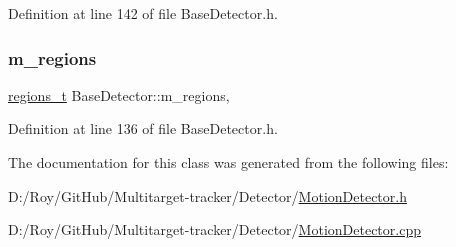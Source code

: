 Definition at line 142 of file Base\+Detector.\+h.

\mbox{\label{class_base_detector_a409c20093acba261db8354ca72058fce}} 
\subsubsection{\texorpdfstring{m\+\_\+regions}{m\_regions}}
{\footnotesize\ttfamily \mbox{\hyperlink{defines_8h_a01db0de56a20f4342820a093c5154536}{regions\+\_\+t}} Base\+Detector\+::m\+\_\+regions\hspace{0.3cm}{\ttfamily [protected]}, {\ttfamily [inherited]}}



Definition at line 136 of file Base\+Detector.\+h.



The documentation for this class was generated from the following files\+:\begin{DoxyCompactItemize}
\item 
D\+:/\+Roy/\+Git\+Hub/\+Multitarget-\/tracker/\+Detector/\mbox{\hyperlink{_motion_detector_8h}{Motion\+Detector.\+h}}\item 
D\+:/\+Roy/\+Git\+Hub/\+Multitarget-\/tracker/\+Detector/\mbox{\hyperlink{_motion_detector_8cpp}{Motion\+Detector.\+cpp}}\end{DoxyCompactItemize}
